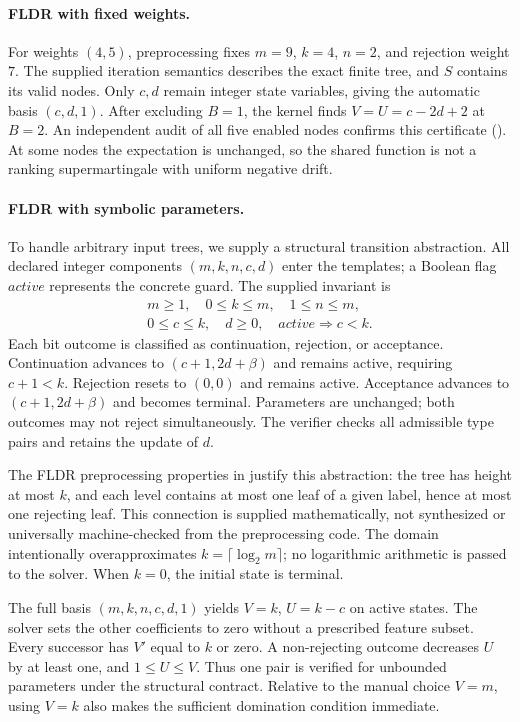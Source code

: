 \paragraph{FLDR with fixed weights.}
For weights $(4,5)$, preprocessing fixes $m=9$, $k=4$, $n=2$, and
rejection weight $7$. The supplied iteration semantics describes the
exact finite tree, and $S$ contains its valid nodes. Only $c,d$ remain
integer state variables, giving the automatic basis $(c,d,1)$.
After excluding $B=1$, the kernel finds $V=U=c-2d+2$ at $B=2$.
An independent audit of all five enabled nodes confirms this certificate
(). At some nodes the expectation is unchanged, so the
shared function is not a ranking supermartingale with uniform negative drift.

\paragraph{FLDR with symbolic parameters.}
To handle arbitrary input trees, we supply a structural transition
abstraction. All declared integer components $(m,k,n,c,d)$ enter the
templates; a Boolean flag $\mathit{active}$ represents the concrete guard.
The supplied invariant is
\[
\begin{gathered}
 m\geq1,\quad0\leq k\leq m,\quad1\leq n\leq m,\\
 0\leq c\leq k,\quad d\geq0,\quad
 \mathit{active}\Rightarrow c<k.
\end{gathered}
\]
Each bit outcome is classified as continuation, rejection, or acceptance.
Continuation advances to $(c+1,2d+\beta)$ and remains active, requiring
$c+1<k$. Rejection resets to $(0,0)$ and remains active. Acceptance
advances to $(c+1,2d+\beta)$ and becomes terminal. Parameters are
unchanged; both outcomes may not reject simultaneously. The verifier
checks all admissible type pairs and retains the update of $d$.

The FLDR preprocessing properties in  justify this
abstraction: the tree has height at most $k$, and each level contains at
most one leaf of a given label, hence at most one rejecting leaf.
This connection is supplied mathematically, not synthesized or
universally machine-checked from the preprocessing code. The domain
intentionally overapproximates $k=\lceil\log_2m\rceil$; no logarithmic
arithmetic is passed to the solver. When $k=0$, the initial state is
terminal.

The full basis $(m,k,n,c,d,1)$ yields $V=k$, $U=k-c$ on active states.
The solver sets the other coefficients to zero without a prescribed
feature subset. Every successor has $V'$ equal to $k$ or zero. A
non-rejecting outcome decreases $U$ by at least one, and $1\leq U\leq V$.
Thus one pair is verified for unbounded parameters under the structural
contract. Relative to the manual choice $V=m$, using $V=k$ also makes
the sufficient domination condition immediate.

